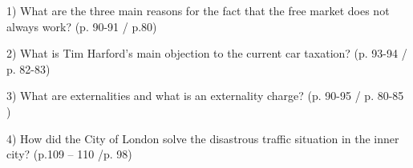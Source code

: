 1) What are the three main reasons for the fact that the free market does not always work? (p. 90-91 / p.80)

2) What is Tim Harford’s main objection to the current car taxation? (p. 93-94 / p. 82-83)

3) What are externalities and what is an externality charge? (p. 90-95 / p. 80-85 )

4) How did the City of London solve the disastrous traffic situation in the inner city? (p.109 – 110 /p. 98)